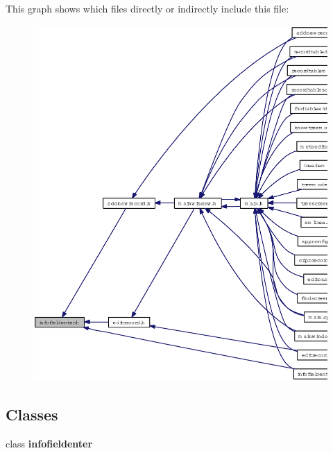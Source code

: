 This graph shows which files directly or indirectly include this file:\begin{figure}[H]
\begin{center}
\leavevmode
\includegraphics[width=326pt]{infofieldenter_8h__dep__incl}
\end{center}
\end{figure}
\subsection*{Classes}
\begin{CompactItemize}
\item 
class {\bf infofieldenter}
\end{CompactItemize}
